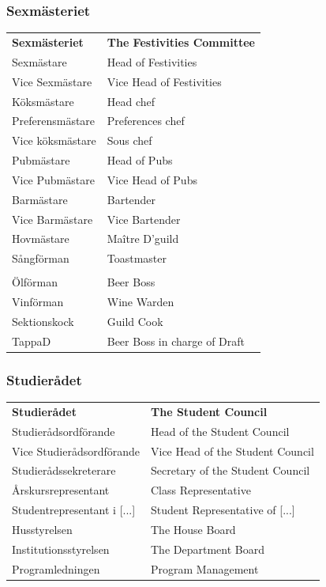 \documentclass{dsekprotokoll}
\begin{document}
\subsubsection*{Sexmästeriet}
\vspace{12pt}
\begin{center}
    \begin{tabular}{R{6.5cm}|L{6.5cm}}
        \textbf{Sexmästeriet} & \textbf{The Festivities Committee}\\
        Sexmästare & Head of Festivities\\
        Vice Sexmästare & Vice Head of Festivities\\
        Köksmästare & Head chef\\
        Preferensmästare & Preferences chef\\
        Vice köksmästare & Sous chef\\
        Pubmästare & Head of Pubs\\
        Vice Pubmästare & Vice Head of Pubs\\
        Barmästare & Bartender\\
        Vice Barmästare & Vice Bartender\\
        Hovmästare & Maître D'guild\\
        Sångförman & Toastmaster\\
        \\

        Ölförman & Beer Boss\\
        Vinförman & Wine Warden\\
        Sektionskock & Guild Cook\\
        TappaD & Beer Boss in charge of Draft\\
    \end{tabular}
\end{center}

\subsubsection*{Studierådet}
\vspace{12pt}
\begin{center}
    \begin{tabular}{R{6.5cm}|L{6.5cm}}
        \textbf{Studierådet} & \textbf{The Student Council}\\
        Studierådsordförande & Head of the Student Council\\
        Vice Studierådsordförande & Vice Head of the Student Council\\
        Studierådssekreterare & Secretary of the Student Council\\
        Årskursrepresentant & Class Representative\\
        Studentrepresentant i [...] & Student Representative of [...]\\
        Husstyrelsen & The House Board\\
        Institutionsstyrelsen & The Department Board\\
        Programledningen & Program Management\\
    \end{tabular}
\end{center}
\end{document}
